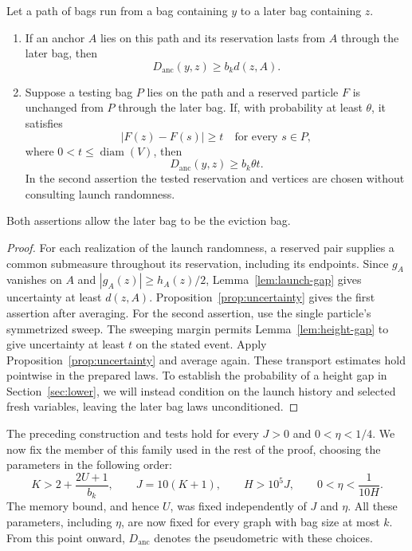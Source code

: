 \begin{samepage}
\begin{lemma}\label{lem:anchor-tests}
Let a path of bags run from a bag containing $y$ to a later bag containing
$z$.
\begin{enumerate}
\item If an anchor $A$ lies on this path and its reservation lasts from
$A$ through the later bag, then
\begin{equation}\label{eq:anchor-launch-test}
 D_{\mathrm{anc}}(y,z)\geq b_k d(z,A).
\end{equation}
\item Suppose a testing bag $P$ lies on the path and a reserved particle
$F$ is unchanged from $P$ through the later bag.  If, with probability at
least $\theta$, it satisfies
\[
 |F(z)-F(s)|\geq t\quad\text{for every }s\in P,
\]
where $0<t\leq\operatorname{diam}(V)$, then
\begin{equation}\label{eq:anchor-height-test}
 D_{\mathrm{anc}}(y,z)\geq b_k\theta t.
\end{equation}
In the second assertion the tested reservation and vertices are chosen
without consulting launch randomness.
\end{enumerate}
Both assertions allow the later bag to be the eviction bag.
\end{lemma}
\end{samepage}

\begin{proof}
For each realization of the launch randomness, a reserved pair supplies
a common submeasure throughout its reservation, including its endpoints.
Since $g_A$ vanishes on $A$ and $|g_A(z)|\geq h_A(z)/2$,
Lemma~\ref{lem:launch-gap} gives uncertainty at least $d(z,A)$.
Proposition~\ref{prop:uncertainty} gives the first assertion after
averaging.  For the second assertion, use the single particle's
symmetrized sweep.  The sweeping margin permits
Lemma~\ref{lem:height-gap} to give uncertainty at least $t$ on the stated
event.  Apply Proposition~\ref{prop:uncertainty} and average again.
These transport estimates hold pointwise in the prepared laws. To
establish the probability of a height gap in Section~\ref{sec:lower},
we will instead condition on the launch history and selected fresh
variables, leaving the later bag laws unconditioned.
\end{proof}

The preceding construction and tests hold for every $J>0$ and
$0<\eta<1/4$. We now fix the member of this family used in the rest
of the proof, choosing the parameters in the following order:
\begin{equation}\label{eq:anchor-parameters}
 K>2+\frac{2U+1}{b_k},\qquad
 J=10(K+1),\qquad H>10^5J,\qquad
 0<\eta<\frac{1}{10H}.
\end{equation}
The memory bound, and hence $U$, was fixed independently of $J$ and
$\eta$. All these parameters, including $\eta$, are now fixed for
every graph with bag size at most $k$. From this point onward,
$D_{\mathrm{anc}}$ denotes the pseudometric with these choices.
